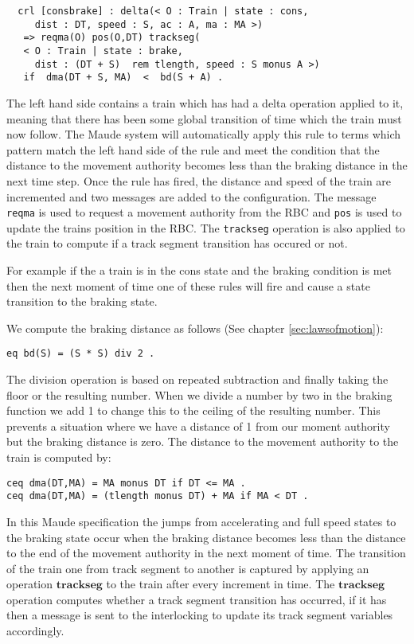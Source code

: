 \begin{lstlisting}
  crl [consbrake] : delta(< O : Train | state : cons, 
     dist : DT, speed : S, ac : A, ma : MA >)   
   => reqma(O) pos(O,DT) trackseg(
   < O : Train | state : brake, 
     dist : (DT + S)  rem tlength, speed : S monus A >)    
   if  dma(DT + S, MA)  <  bd(S + A) .
\end{lstlisting}

The left hand side contains a train which has had a delta operation applied to it, meaning that there has been some global transition of time which the train must now follow. The Maude system will automatically apply this rule to terms which pattern match the left hand side of the rule and meet the condition that the distance to the movement authority becomes less than the braking distance in the next time step. Once the rule has fired, the distance and speed of the train are incremented and two messages are added to the configuration. The message \texttt{reqma} is used to request a movement authority from the RBC and \texttt{pos} is used to update the trains position in the RBC. The \texttt{trackseg} operation is also applied to the train to compute if a track segment transition has occured or not. 

For example if the a train is in the cons state and the braking condition is met then the next moment of time one of these rules will fire and cause a state transition to the braking state. 

We compute the braking distance as follows (See chapter \ref{sec:lawsofmotion}): 
\begin{center}\texttt{eq bd(S) = (S * S) div 2 .}\end{center}


The division operation is based on repeated subtraction and finally taking the floor or the resulting number. When we divide a number by two in the braking function we add 1 to change this to the ceiling of the resulting number. This prevents a situation where we have a distance of 1 from our moment authority but the braking distance is zero.
The distance to the movement authority to the train is computed by:
\begin{center}
\texttt{ceq dma(DT,MA) = MA monus DT if DT <= MA .} \\
\texttt{ceq dma(DT,MA) = (tlength monus DT) + MA if MA < DT .}
\end{center}

In this Maude specification the jumps from accelerating and full speed states to the braking state occur when the braking distance becomes less than the distance to the end of the movement authority in the next moment of time.  The transition of the train one from track segment to another is captured by applying an operation $\textbf{trackseg}$ to the train after every increment in time. The $\textbf{trackseg}$ operation computes whether a track segment transition has occurred, if it has then a message is sent to the interlocking to update its track segment variables accordingly.

